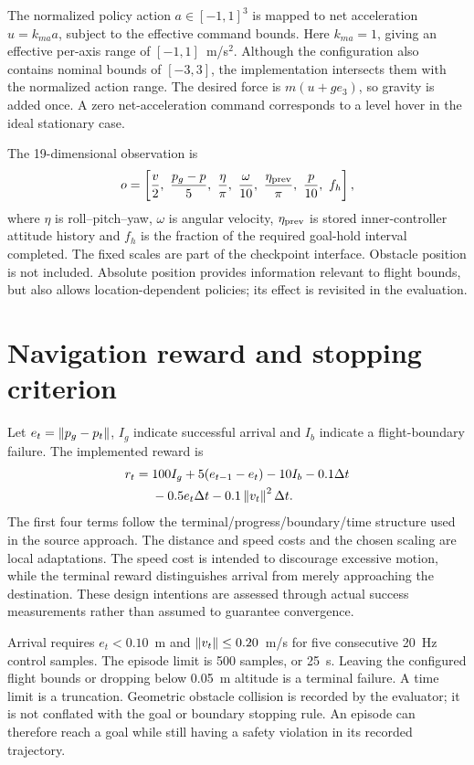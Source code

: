 The normalized policy action $a\in[-1,1]^3$ is mapped to net acceleration $u=k_{ma}a$, subject to the effective command bounds. Here $k_{ma}=1$, giving an effective per-axis range of $[-1,1]$~m/s$^2$. Although the configuration also contains nominal bounds of $[-3,3]$, the implementation intersects them with the normalized action range. The desired force is $m(u+g e_3)$, so gravity is added once. A zero net-acceleration command corresponds to a level hover in the ideal stationary case.

The 19-dimensional observation is
\begin{equation}
o=\left[\frac{v}{2},\ \frac{p_g-p}{5},\ \frac{\eta}{\pi},\
\frac{\omega}{10},\ \frac{\eta_{\rm prev}}{\pi},\ \frac{p}{10},\ f_h\right],
\end{equation}
where $\eta$ is roll--pitch--yaw, $\omega$ is angular velocity, $\eta_{\rm prev}$ is stored inner-controller attitude history and $f_h$ is the fraction of the required goal-hold interval completed. The fixed scales are part of the checkpoint interface. Obstacle position is not included. Absolute position provides information relevant to flight bounds, but also allows location-dependent policies; its effect is revisited in the evaluation.

\section{Navigation reward and stopping criterion}
Let $e_t=\left\lVert p_g-p_t\right\rVert$, $I_g$ indicate successful arrival and $I_b$ indicate a flight-boundary failure. The implemented reward is
\begin{align}
r_t={}&100I_g+5(e_{t-1}-e_t)-10I_b-0.1\Delta t\nonumber\\
&-0.5e_t\Delta t-0.1\left\lVert v_t\right\rVert^2\Delta t.
\label{eq:reward}
\end{align}
The first four terms follow the terminal/progress/boundary/time structure used in the source approach. The distance and speed costs and the chosen scaling are local adaptations. The speed cost is intended to discourage excessive motion, while the terminal reward distinguishes arrival from merely approaching the destination. These design intentions are assessed through actual success measurements rather than assumed to guarantee convergence.

Arrival requires $e_t<0.10$~m and $\left\lVert v_t\right\rVert\leq0.20$~m/s for five consecutive 20~Hz control samples. The episode limit is 500 samples, or 25~s. Leaving the configured flight bounds or dropping below 0.05~m altitude is a terminal failure. A time limit is a truncation. Geometric obstacle collision is recorded by the evaluator; it is not conflated with the goal or boundary stopping rule. An episode can therefore reach a goal while still having a safety violation in its recorded trajectory.


